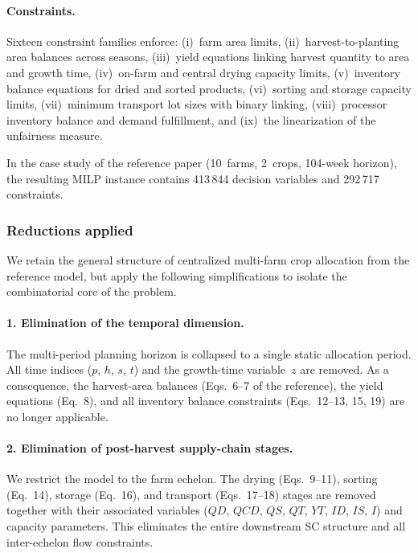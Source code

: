 \paragraph{Constraints.}
Sixteen constraint families enforce: (i)~farm area limits, (ii)~harvest-to-planting area balances across seasons, (iii)~yield equations linking harvest quantity to area and growth time, (iv)~on-farm and central drying capacity limits, (v)~inventory balance equations for dried and sorted products, (vi)~sorting and storage capacity limits, (vii)~minimum transport lot sizes with binary linking, (viii)~processor inventory balance and demand fulfillment, and (ix)~the linearization of the unfairness measure.

In the case study of the reference paper (10~farms, 2~crops, 104-week horizon), the resulting MILP instance contains 413\,844 decision variables and 292\,717 constraints.

\subsubsection{Reductions applied}
\label{sub:reductions}

We retain the general structure of centralized multi-farm crop allocation from the reference model, but apply the following simplifications to isolate the combinatorial core of the problem.

\paragraph{1. Elimination of the temporal dimension.}
The multi-period planning horizon is collapsed to a single static allocation period. All time indices ($p$, $h$, $s$, $t$) and the growth-time variable~$z$ are removed. As a consequence, the harvest-area balances (Eqs.~6--7 of the reference), the yield equations (Eq.~8), and all inventory balance constraints (Eqs.~12--13, 15, 19) are no longer applicable.

\paragraph{2. Elimination of post-harvest supply-chain stages.}
We restrict the model to the farm echelon. The drying (Eqs.~9--11), sorting (Eq.~14), storage (Eq.~16), and transport (Eqs.~17--18) stages are removed together with their associated variables ($QD$, $QCD$, $QS$, $QT$, $YT$, $ID$, $IS$, $I$) and capacity parameters. This eliminates the entire downstream SC structure and all inter-echelon flow constraints.

